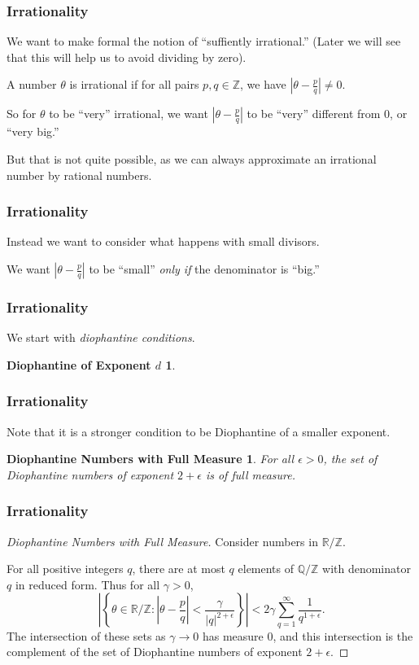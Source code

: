 \documentclass{beamer}
\newcommand{\Z}{\mathbb{Z}}
\newcommand{\Q}{\mathbb{Q}}
\newcommand{\R}{\mathbb{R}}
\begin{document}
\begin{frame}
  \frametitle{Irrationality}
  We want to make formal the notion of ``suffiently irrational.''
  (Later we will see that this will help us to avoid dividing by zero).  

  A number $\theta$ is irrational if for all pairs $p, q \in \Z$, we have
  $\left|\theta - \frac{p}{q}\right| \neq 0$.

  So for $\theta$ to be ``very'' irrational, we want $\left|\theta -
    \frac{p}{q}\right|$ to be ``very'' different from $0$, or ``very big.''

  But that is not quite possible, as we can always approximate an irrational
  number by rational numbers.
\end{frame}

\begin{frame}
  \frametitle{Irrationality}
  Instead we want to consider what happens with small divisors.

  We want $\left| \theta - \frac{p}{q} \right|$ to be ``small'' \emph{only if}
  the denominator is ``big.''
\end{frame}

\begin{frame}
  \frametitle{Irrationality}
  We start with \emph{diophantine conditions}.
  \newtheorem{dionum}{Diophantine of Exponent $d$}
  \begin{dionum}
    \dionumber{}
  \end{dionum}
\end{frame}

\begin{frame}
  \frametitle{Irrationality}
  Note that it is a stronger condition to be Diophantine of a smaller exponent.
  
  \newtheorem{diomany}{Diophantine Numbers with Full Measure}
  \begin{diomany}
    For all $\epsilon > 0$, the set of Diophantine numbers of exponent $2 +
    \epsilon$ is of full measure.
  \end{diomany}
\end{frame}

\begin{frame}
  \frametitle{Irrationality}
  \begin{proof}[Diophantine Numbers with Full Measure]
    Consider numbers in $\R / \Z$.

    For all positive integers $q$, there are at most $q$ elements of $\Q / \Z$
    with denominator $q$ in reduced form.
    Thus for all $\gamma > 0$,
    \begin{equation*}
      \left|\left\{ \theta \in \R / \Z : \left| \theta - \frac{p}{q} \right| <
          \frac{\gamma}{|q|^{2 + \epsilon}} \right\} \right| < 2 \gamma \sum_{q =
      1}^{\infty} \frac{1}{q^{1 + \epsilon}}.
  \end{equation*}
  The intersection of these sets as $\gamma \to 0$ has measure $0$, and this
  intersection is the complement of the set of Diophantine numbers of exponent
  $2 + \epsilon$.
  \end{proof}
\end{frame}
\end{document}

